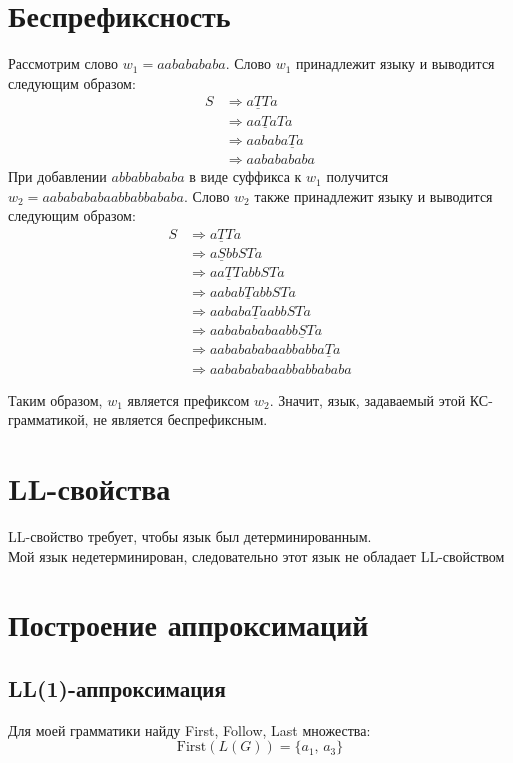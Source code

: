 \documentclass[12pt,a4paper]{article}
\begin{document}
\section*{Беспрефиксность}
Рассмотрим слово $w_1=aababababa$. Слово $w_1$ принадлежит языку и выводится следующим образом:
\[
\begin{aligned}
S &\Rightarrow a\underline{T}Ta \\
  &\Rightarrow aa\underline{T}aTa \\
  &\Rightarrow aababa\underline{T}a \\
  &\Rightarrow aababababa
\end{aligned}
\]
При добавлении $abbabbababa$ в виде суффикса к $w_1$ получится $w_2=aababababaabbabbababa$.
Слово $w_2$ также принадлежит языку и выводится следующим образом:
\[
\begin{aligned}
S &\Rightarrow a\underline{T}Ta \\
  &\Rightarrow a\underline{S}bbSTa \\
  &\Rightarrow aa\underline{T}TabbSTa \\
  &\Rightarrow aabab\underline{T}abbSTa \\
  &\Rightarrow aababa\underline{T}aabbSTa \\
  &\Rightarrow aababababaabb\underline{S}Ta \\
  &\Rightarrow aababababaabbabba\underline{T}a \\
  &\Rightarrow aababababaabbabbababa
\end{aligned}
\]

Таким образом, $w_1$ является префиксом $w_2$. Значит, язык, задаваемый этой КС-грамматикой, не является беспрефиксным.

\section*{LL-свойства}
LL-свойство требует, чтобы язык был детерминированным.\\
Мой язык недетерминирован, следовательно этот язык не обладает LL-свойством

\section*{Построение аппроксимаций}
\subsection*{LL(1)-аппроксимация}
Для моей грамматики найду First, Follow, Last множества:
\[
\mathrm{First}(L(G))=\{a_{1},\,a_{3}\}
\]
\end{document}
